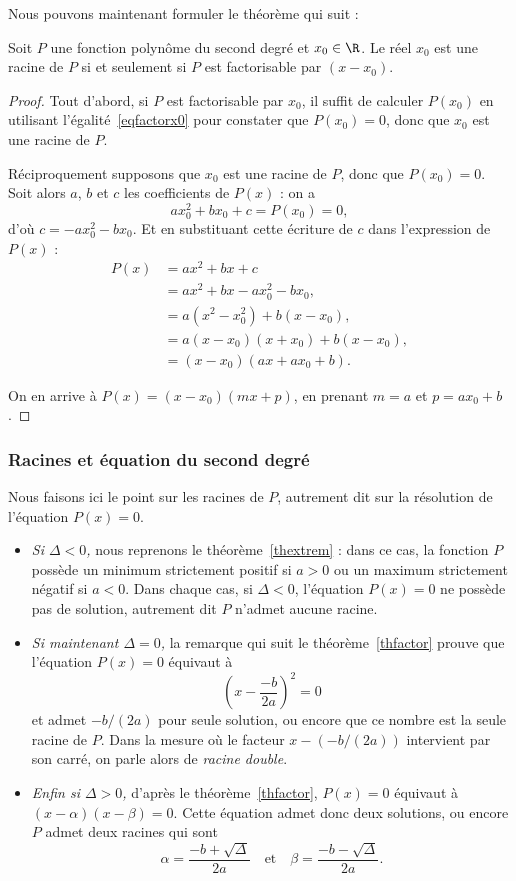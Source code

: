 Nous pouvons maintenant formuler le théorème qui suit :
\begin{thm}
Soit $P$ une fonction polynôme du second degré et $x_0\in\R$. Le réel $x_0$ est une racine de $P$ si et seulement si $P$ est factorisable par $(x-x_0)$.
\end{thm}

\begin{proof}
Tout d'abord, si $P$ est factorisable par $x_0$, il suffit de calculer $P(x_0)$ en utilisant l'égalité \eqref{eqfactorx0} pour constater que $P(x_0)=0$, donc que $x_0$ est une racine de $P$.

Réciproquement supposons que $x_0$ est une racine de $P$, donc que $P(x_0)=0$. Soit alors $a$, $b$ et $c$ les coefficients de $P(x)$ : on a 
\[ax_0^2+bx_0+c=P(x_0)=0,\]
 d'où $c=-ax_0^2-bx_0$. Et en substituant cette écriture de $c$ dans l'expression de $P(x)$ :
\begin{align*}
P(x)&=ax^2+bx+c\\
&= ax^2+bx-ax_0^2-bx_0,\\
&= a(x^2-x_0^2)+b(x-x_0),\\
&= a(x-x_0)(x+x_0)+b(x-x_0),\\
&=(x-x_0)(ax+ax_0+b).
\end{align*}

On en arrive à $P(x)=(x-x_0)(mx+p)$, en prenant $m=a$ et $p=ax_0+b$.
\end{proof}

\subsubsection{Racines et équation du second degré}
Nous faisons ici le point sur les racines de $P$, autrement dit sur la résolution de l'équation 
$P(x)=0$.


\begin{itemize}
\item  \textit{Si $\Delta<0$,} nous reprenons le théorème \ref{thextrem} : dans ce cas, la fonction $P$ possède un minimum strictement positif si $a>0$ ou un maximum strictement négatif si $a<0$. Dans chaque cas, si $\Delta<0$, l'équation $P(x)=0$ ne possède pas de solution, autrement dit $P$ n'admet aucune racine.

\item  \textit{Si maintenant $\Delta=0$,} la remarque qui suit le théorème \ref{thfactor} prouve que l'équation $P(x)=0$ équivaut à
\[
\left(x-\frac{-b}{2a}\right)^2=0
\]
 et admet $-b/(2a)$ pour seule solution, ou encore que ce nombre est la seule racine de $P$. Dans la mesure où le facteur $x-(-b/(2a))$ intervient par son carré, on parle alors de \emph{racine double}.
 
 \item  \textit{Enfin si $\Delta>0$,} d'après le théorème \ref{thfactor}, $P(x)=0$ équivaut à $(x-\alpha)(x-\beta)=0$.
 Cette équation admet donc deux solutions, ou encore $P$ admet deux racines qui sont
 \[
 \alpha=\frac{-b+\sqrt{\Delta}}{2a}\quad\text{et}\quad\beta=\frac{-b-\sqrt{\Delta}}{2a}.
 \]
\end{itemize}


